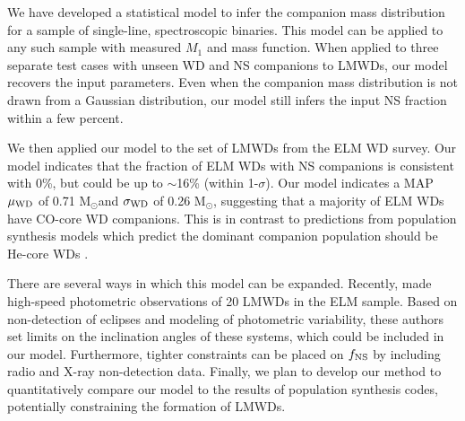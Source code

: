 \documentclass[apjl]{emulateapj}
\newcommand{\Msun}{\ifmmode {{\rm M}_{\odot}}\else M$_{\odot}$\fi}
\begin{document}
We have developed a statistical model to infer the companion mass distribution for a sample of single-line, spectroscopic binaries. This model can be applied to any such sample with measured $M_1$ and mass function. When applied to three separate test cases with unseen WD and NS companions to LMWDs, our model recovers the input parameters. Even when the companion mass distribution is not drawn from a Gaussian distribution, our model still infers the input NS fraction within a few percent.


We then applied our model to the set of LMWDs from the ELM WD survey. Our model indicates that the fraction of ELM WDs with NS companions is consistent with 0\%, but could be up to $\sim$16\% (within 1-$\sigma$). Our model indicates a MAP $\mu_{\rm WD}$ of 0.71 \Msun and $\sigma_{\rm WD}$ of 0.26 \Msun, suggesting that a majority of ELM WDs have CO-core WD companions. This is in contrast to predictions from population synthesis models which predict the dominant companion population should be He-core WDs \citep[e.g.,][]{toonen12}. 



There are several ways in which this model can be expanded. Recently, \citet{hermes14} made high-speed photometric observations of 20 LMWDs in the ELM sample. Based on non-detection of eclipses and modeling of photometric variability, these authors set limits on the inclination angles of these systems, which could be included in our model. Furthermore, tighter constraints can be placed on $f_{\rm NS}$ by including radio and X-ray non-detection data. Finally, we plan to develop our method to quantitatively compare our model to the results of population synthesis codes, potentially constraining the formation of LMWDs.

\end{document}
